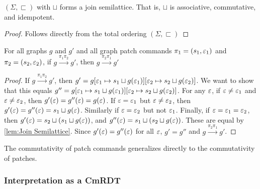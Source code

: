 \begin{lemma}
  \label{lem:Join Semilattice}
  $(\Sigma, \sqsubset)$ with $\sqcup$ forms a join semilattice. That is, $\sqcup$ is associative, commutative, and idempotent. 
\end{lemma}
\begin{proof}
    Follows directly from the total ordering $(\Sigma, \sqsubset)$
\end{proof}

\begin{theorem}[Commutativity]
  \label{thm:Commutativity}
  For all graphs $g$ and $g'$ and all graph patch commands $\pi_1 = (s_1, \varepsilon_1)$ and  $\pi_2 = (s_2, \varepsilon_2)$, 
  if $g \overset{\pi_1 \pi_2}{\longrightarrow} g'$,
  then $g \overset{\pi_2 \pi_1}{\longrightarrow} g'$
\end{theorem}
\begin{proof}
  If $g \overset{\pi_1 \pi_2}{\longrightarrow} g'$, then $g' = g[\varepsilon_1 \mapsto s_1 \sqcup g(\varepsilon_1)][\varepsilon_2 \mapsto s_2 \sqcup g(\varepsilon_2)]$. We want to show that this equals $g'' = g[\varepsilon_1 \mapsto s_1 \sqcup g(\varepsilon_1)][\varepsilon_2 \mapsto s_2 \sqcup g(\varepsilon_2)]$. For any $\varepsilon$, if $\varepsilon \neq \varepsilon_1$ and $\varepsilon \neq \varepsilon_2$, then $g'(\varepsilon) = g''(\varepsilon) = g(\varepsilon)$. If $\varepsilon = \varepsilon_1$ but $\varepsilon\neq \varepsilon_2$, then $g'(\varepsilon) = g''(\varepsilon) = s_1 \sqcup g(\varepsilon)$. Similarly if $\varepsilon=\varepsilon_2$ but not $\varepsilon_1$. Finally, if $\varepsilon=\varepsilon_1=\varepsilon_2$, then $g'(\varepsilon)=s_2\sqcup(s_1\sqcup g(\varepsilon))$, and $g''(\varepsilon)=s_1\sqcup(s_2\sqcup g(\varepsilon))$. These are equal by \autoref{lem:Join Semilattice}. Since $g'(\varepsilon) = g''(\varepsilon)$ for all $\varepsilon$, $g' = g''$ and  $g \overset{\pi_2 \pi_1}{\longrightarrow} g'$.
\end{proof}

The commutativity of patch commands generalizes directly to the commutativity of patches. 

\subsubsection{Interpretation as a CmRDT}

